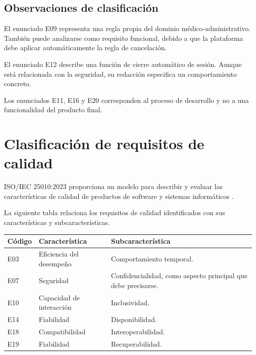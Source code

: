 \documentclass[12pt,a4paper]{article}
\begin{document}
\subsection{Observaciones de clasificación}

El enunciado E09 representa una regla propia
del dominio médico-administrativo. También
puede analizarse como requisito funcional,
debido a que la plataforma debe aplicar
automáticamente la regla de cancelación.

El enunciado E12 describe una función de
cierre automático de sesión. Aunque está
relacionada con la seguridad, su redacción
especifica un comportamiento concreto.

Los enunciados E11, E16 y E20 corresponden
al proceso de desarrollo y no a una
funcionalidad del producto final.

\section{Clasificación de requisitos de calidad}

ISO/IEC 25010:2023 proporciona un modelo
para describir y evaluar las características
de calidad de productos de software y
sistemas informáticos \cite{iso25010}.

La siguiente tabla relaciona los requisitos
de calidad identificados con sus
características y subcaracterísticas.

\begin{longtable}{
P{1.5cm}
P{5.0cm}
P{9.3cm}
}

\toprule

\textbf{Código} &
\textbf{Característica} &
\textbf{Subcaracterística}\\

\midrule
\endhead

E03 &
Eficiencia del desempeño &
Comportamiento temporal.\\

E07 &
Seguridad &
Confidencialidad, como aspecto principal
que debe precisarse.\\

E10 &
Capacidad de interacción &
Inclusividad.\\

E14 &
Fiabilidad &
Disponibilidad.\\

E18 &
Compatibilidad &
Interoperabilidad.\\

E19 &
Fiabilidad &
Recuperabilidad.\\

\bottomrule

\end{longtable}
\end{document}
